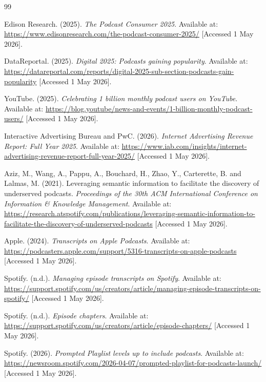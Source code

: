 \documentclass[11pt,a4paper]{article}
\begin{document}
\begin{thebibliography}{99}

Edison Research. (2025).
\textit{The Podcast Consumer 2025}.
Available at: \url{https://www.edisonresearch.com/the-podcast-consumer-2025/}
[Accessed 1 May 2026].

DataReportal. (2025).
\textit{Digital 2025: Podcasts gaining popularity}.
Available at: \url{https://datareportal.com/reports/digital-2025-sub-section-podcasts-gain-popularity}
[Accessed 1 May 2026].

YouTube. (2025).
\textit{Celebrating 1 billion monthly podcast users on YouTube}.
Available at: \url{https://blog.youtube/news-and-events/1-billion-monthly-podcast-users/}
[Accessed 1 May 2026].

Interactive Advertising Bureau and PwC. (2026).
\textit{Internet Advertising Revenue Report: Full Year 2025}.
Available at: \url{https://www.iab.com/insights/internet-advertising-revenue-report-full-year-2025/}
[Accessed 1 May 2026].


Aziz, M., Wang, A., Pappu, A., Bouchard, H., Zhao, Y., Carterette, B. and Lalmas, M. (2021).
Leveraging semantic information to facilitate the discovery of underserved podcasts.
\textit{Proceedings of the 30th ACM International Conference on Information \& Knowledge Management}.
Available at: \url{https://research.atspotify.com/publications/leveraging-semantic-information-to-facilitate-the-discovery-of-underserved-podcasts}
[Accessed 1 May 2026].

Apple. (2024).
\textit{Transcripts on Apple Podcasts}.
Available at: \url{https://podcasters.apple.com/support/5316-transcripts-on-apple-podcasts}
[Accessed 1 May 2026].

Spotify. (n.d.).
\textit{Managing episode transcripts on Spotify}.
Available at: \url{https://support.spotify.com/us/creators/article/managing-episode-transcripts-on-spotify/}
[Accessed 1 May 2026].

Spotify. (n.d.).
\textit{Episode chapters}.
Available at: \url{https://support.spotify.com/us/creators/article/episode-chapters/}
[Accessed 1 May 2026].

Spotify. (2026).
\textit{Prompted Playlist levels up to include podcasts}.
Available at: \url{https://newsroom.spotify.com/2026-04-07/prompted-playlist-for-podcasts-launch/}
[Accessed 1 May 2026].


\end{thebibliography}
\end{document}

